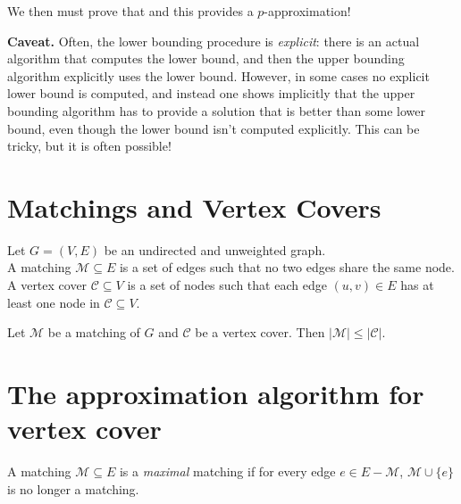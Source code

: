 \documentclass[11  pt]{article}
\begin{document}
	We then must prove that  and this provides a $p$-approximation! 
	
	\vfill
	
	
	\textbf{Caveat.} Often, the lower bounding procedure is \emph{explicit}: there is an actual algorithm that computes the lower bound, and then the upper bounding algorithm explicitly uses the lower bound. However, in some cases no explicit lower bound is computed, and instead one shows implicitly that the upper bounding algorithm has to provide a solution that is better than some lower bound, even though the lower bound isn't computed explicitly. This can be tricky, but it is often possible!
	
	\newpage
	\section{Matchings and Vertex Covers}
	Let $G = (V,E)$ be an undirected and unweighted graph. \\
	
	A matching $\mathcal{M} \subseteq E$ is a set of edges such that no two edges share the same node. \\ 
	
	A vertex cover $\mathcal{C} \subseteq V$ is a set of nodes such that each edge $(u,v) \in E$ has at least one node in $\mathcal{C} \subseteq V$.\\
	\vspace{5cm} 
	
	
	\begin{lemma}
		Let $\mathcal{M}$ be a matching of $G$ and $\mathcal{C}$ be a vertex cover. Then $|\mathcal{M}| \leq |\mathcal{C}|$.
	\end{lemma}

	
	

	
	\newpage
	\section{The approximation algorithm for vertex cover}
	A matching $\mathcal{M} \subseteq E$ is a \emph{maximal} matching if for every edge $e \in E - \mathcal{M}$, $\mathcal{M} \cup \{e\}$ is no longer a matching. \\
	
\end{document}
